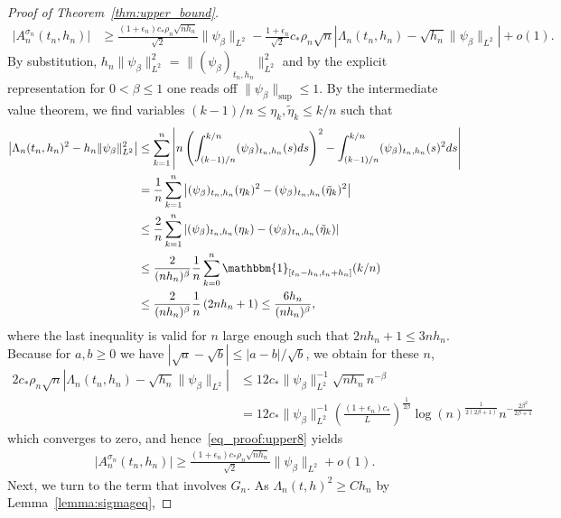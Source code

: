 \documentclass[10.5pt,letter]{article}
\numberwithin{equation}{section}
\theoremstyle{definition}
\newcommand{\1}{\mathbbm{1}}
\begin{document}
\begin{proof}[Proof of Theorem~\ref{thm:upper_bound}]
\begin{align}\label{eq_proof:upper8}
    \big|A_n^{\sigma_n}(t_n,h_n)\big| &\geq \frac{(1+\epsilon_n)c_*\rho_n \sqrt{nh_n}}{\sqrt{2}}\|\psi_\beta\|_{L^2} -\frac{1+\epsilon_n}{\sqrt{2}}c_*\rho_n\sqrt{n}\left| \Lambda_n(t_n,h_n) - \sqrt{h_n}\|\psi_\beta\|_{L^2}\right| + o(1).
\end{align}
By substitution, $h_n\|\psi_\beta\|_{L^2}^2$ = $\|(\psi_\beta)_{t_n,h_n}\|_{L^2}^2$ and by the explicit representation for $0<\beta\leq 1$ one reads off $\|\psi_\beta\|_{\sup}\leq 1$. By the intermediate value theorem, we find variables $(k-1)/n\leq \eta_k,\tilde{\eta}_k\leq k/n$ such that
\begin{align*}
    \left| \Lambda_n(t_n,h_n)^2- h_n\|\psi_\beta\|_{L^2}^2\right| &\leq \sum_{k=1}^n \left| n\left(\int_{(k-1)/n}^{k/n} (\psi_\beta)_{t_n,h_n}(s) ds\right)^2 - \int_{(k-1)/n}^{k/n} (\psi_{\beta})_{t_n,h_n}(s)^2 ds\right| \\
    &= \frac1n \sum_{k=1}^n \left| (\psi_{\beta})_{t_n,h_n}(\eta_k)^2-(\psi_{\beta})_{t_n,h_n}(\tilde{\eta}_k)^2 \right|\\
    &\leq \frac2n \sum_{k=1}^n  \left| (\psi_{\beta})_{t_n,h_n}(\eta_k)-(\psi_{\beta})_{t_n,h_n}(\tilde{\eta}_k) \right|\\
    &\leq \frac{2}{(nh_n)^\beta}\frac1n \sum_{k=0}^n \1_{[t_n-h_n, t_n+h_n]}(k/n) \\
    &\leq \frac{2}{(nh_n)^\beta}\frac1n \left( 2nh_n + 1\right) \leq \frac{6h_n}{(nh_n)^\beta},
\end{align*}
where the last inequality is valid for $n$ large enough such that $2nh_n+1\leq 3nh_n$. Because for $a,b\geq 0$ we have $|\sqrt{a}-\sqrt{b}| \leq |a-b|/\sqrt{b}$, we obtain for these $n$,
\begin{align*}
    2c_*\rho_n\sqrt{n}\left| \Lambda_n(t_n,h_n) - \sqrt{h_n}\|\psi_\beta\|_{L^2}\right| &\leq 12c_* \|\psi_\beta\|_{L^2}^{-1} \sqrt{nh_n}n^{-\beta}\\
    &= 12c_*\|\psi_\beta\|_{L^2}^{-1}\left(\frac{(1+\epsilon_n)c_*}{L}\right)^{\frac{1}{2\beta}} \log(n)^{\frac{1}{2(2\beta+1)}} n^{-\frac{2\beta^2}{2\beta+1}}
\end{align*} 
which converges to zero, and hence~\eqref{eq_proof:upper8} yields
\begin{align}\label{eq_proof:upper2}
    \big|A_n^{\sigma_n}(t_n,h_n)\big| \geq \frac{(1+\epsilon_n)c_*\rho_n \sqrt{nh_n}}{\sqrt{2}}\|\psi_\beta\|_{L^2} + o(1).
\end{align} 
Next, we turn to the term that involves $G_n$. As $\Lambda_n(t,h)^2\geq Ch_n$ by Lemma~\ref{lemma:sigmageq},

\end{proof}
\end{document}
